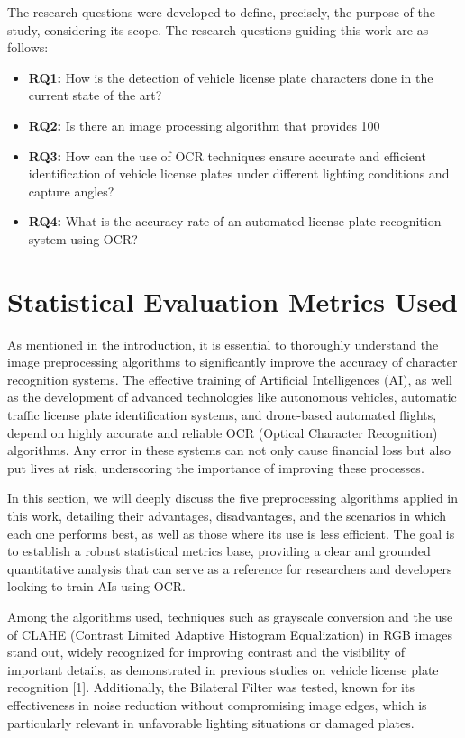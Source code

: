 \documentclass[conference]{IEEEtran}
\begin{document}
	The research questions were developed to define, precisely, the purpose of the study, considering its scope. The research questions guiding this work are as follows:
	
	\begin{itemize}
		\item \textbf{RQ1:} How is the detection of vehicle license plate characters done in the current state of the art?
		\item \textbf{RQ2:} Is there an image processing algorithm that provides 100%
		\item \textbf{RQ3:} How can the use of OCR techniques ensure accurate and efficient identification of vehicle license plates under different lighting conditions and capture angles?
		\item \textbf{RQ4:} What is the accuracy rate of an automated license plate recognition system using OCR?
	\end{itemize}
	
	\section{Statistical Evaluation Metrics Used}
	
	As mentioned in the introduction, it is essential to thoroughly understand the image preprocessing algorithms to significantly improve the accuracy of character recognition systems. The effective training of Artificial Intelligences (AI), as well as the development of advanced technologies like autonomous vehicles, automatic traffic license plate identification systems, and drone-based automated flights, depend on highly accurate and reliable OCR (Optical Character Recognition) algorithms. Any error in these systems can not only cause financial loss but also put lives at risk, underscoring the importance of improving these processes.
	
	In this section, we will deeply discuss the five preprocessing algorithms applied in this work, detailing their advantages, disadvantages, and the scenarios in which each one performs best, as well as those where its use is less efficient. The goal is to establish a robust statistical metrics base, providing a clear and grounded quantitative analysis that can serve as a reference for researchers and developers looking to train AIs using OCR.
	
	Among the algorithms used, techniques such as grayscale conversion and the use of CLAHE (Contrast Limited Adaptive Histogram Equalization) in RGB images stand out, widely recognized for improving contrast and the visibility of important details, as demonstrated in previous studies on vehicle license plate recognition [1]. Additionally, the Bilateral Filter was tested, known for its effectiveness in noise reduction without compromising image edges, which is particularly relevant in unfavorable lighting situations or damaged plates.
	
\end{document}
